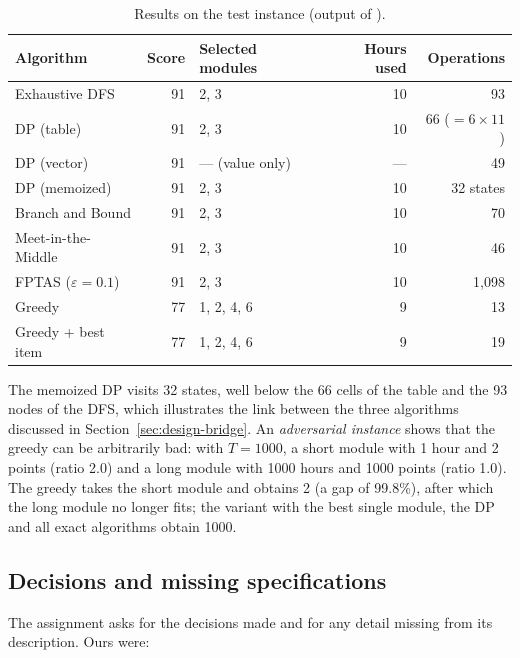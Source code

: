 \begin{table}[h]
\centering
\caption{Results on the test instance (output of ).}\label{tab:instance-results}
\small
\begin{tabular}{@{}l r l r r@{}}
\toprule
Algorithm & Score & Selected modules & Hours used & Operations\\
\midrule
Exhaustive DFS & 91 & 2, 3 & 10 & 93\\
DP (table) & 91 & 2, 3 & 10 & 66 ($=6\times11$)\\
DP (vector) & 91 & --- (value only) & --- & 49\\
DP (memoized) & 91 & 2, 3 & 10 & 32 states\\
Branch and Bound & 91 & 2, 3 & 10 & 70\\
Meet-in-the-Middle & 91 & 2, 3 & 10 & 46\\
FPTAS ($\varepsilon=0.1$) & 91 & 2, 3 & 10 & 1,098\\
Greedy & 77 & 1, 2, 4, 6 & 9 & 13\\
Greedy + best item & 77 & 1, 2, 4, 6 & 9 & 19\\
\bottomrule
\end{tabular}
\end{table}

The memoized DP visits 32 states, well below the 66 cells of the table and the 93 nodes of the DFS, which illustrates the link between the three algorithms discussed in Section~\ref{sec:design-bridge}. An \emph{adversarial instance} shows that the greedy can be arbitrarily bad: with $T=1000$, a short module with 1 hour and 2 points (ratio 2.0) and a long module with 1000 hours and 1000 points (ratio 1.0). The greedy takes the short module and obtains 2 (a gap of 99.8\%), after which the long module no longer fits; the variant with the best single module, the DP and all exact algorithms obtain 1000.

\subsection{Decisions and missing specifications}\label{sec:decisions}

The assignment asks for the decisions made and for any detail missing from its description. Ours were:

